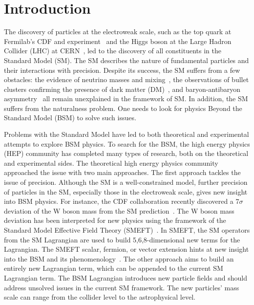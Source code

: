 \chapter{Introduction}\label{sec:introduction}

The discovery of particles at the electroweak scale, such as the top quark at Fermilab's CDF and \DZERO experiment~\cite{topD0,topCDF} and the Higgs boson at the Large Hadron Collider (LHC) at CERN~\cite{higgscms,higgsatlas}, led to the discovery of all constituents in the Standard Model (SM).
The SM describes the nature of fundamental particles and their interactions with precision.
Despite its success, the SM suffers from a few obstacles:
the evidence of neutrino masses and mixing~\cite{neutrino}, the observations of bullet clusters confirming the presence of dark matter (DM)~\cite{Baumgart:2009tn,Kaplan:2009ag,Chan:2011aa,Dienes:2011ja,Dienes:2012yz}, and baryon-antibaryon asymmetry~\cite{Cui:2014twa} all remain unexplained in the framework of SM.
In addition, the SM suffers from the naturalness problem.
One needs to look for physics Beyond the Standard Model (BSM) to solve such issues.

Problems with the Standard Model have led to both theoretical and experimental attempts to explore BSM physics.
To search for the BSM, the high energy physics (HEP) community has completed many types of research, both on the theoretical and experimental sides.
The theoretical high energy physics community approached the issue with two main approaches.
The first approach tackles the issue of precision.
Although the SM is a well-constrained model, further precision of particles in the SM, especially those in the electroweak scale, gives new insight into BSM physics.
For instance, the CDF collaboration recently discovered a 7$\sigma$ deviation of the W boson mass from the SM prediction~\cite{Aaltonen:2022aaa}.
The W boson mass deviation has been interpreted for new physics using the framework of the Standard Model Effective Field Theory (SMEFT)~\cite{Mishima:2022aab}.
In SMEFT, the SM operators from the SM Lagrangian are used to build 5,6,8-dimensional new terms for the Lagrangian.
The SMEFT scalar, fermion, or vector extension hints at new insight into the BSM and its phenomenology~\cite{Mishima:2022aab}.
The other approach aims to build an entirely new Lagrangian term, which can be appended to the current SM Lagrangian term.
The BSM Lagrangian introduces new particle fields and should address unsolved issues in the current SM framework.
The new particles' mass scale can range from the collider level to the astrophysical level.






